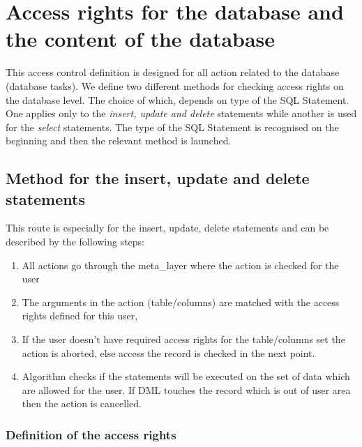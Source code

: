 
\section{Access rights for the database and the content of the database \label{acfdb}}
This access control definition is designed for all action related to the database (database tasks).
We define two different methods for checking access rights on the database level. The choice of which,
depends on type of the SQL Statement.
One applies only to the \emph{insert, update and delete}
statements while another is used for the \emph{select} statements. The type of the SQL
Statement is recognised on the beginning and then the relevant method
is launched.

\subsection{Method for the insert, update and delete statements \label{insertupdatedelete}}

This route is especially for the insert, update, delete statements and can be described by the following steps: 
\begin{enumerate}
\item All actions go through the meta\_layer where the action is checked for the user
\item The arguments in the action (table/columns) are matched with the access
rights defined for this user,
\item If the user doesn't have required access rights for the table/columns
set the action is aborted, else access the record is checked in the next point. 
\item Algorithm checks if the statements will be executed on the set of data which are allowed for the user. If DML touches the record which is out of user area then the action is cancelled.
\end{enumerate}

\subsubsection{Definition of the access rights\label{definitionarDB}}

